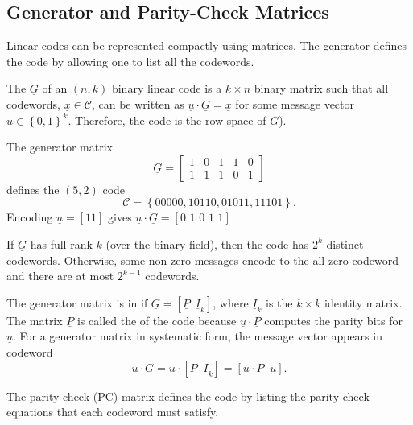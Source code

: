 \subsection{Generator and Parity-Check Matrices}

Linear codes can be represented compactly using matrices.
The generator defines the code by allowing one to list all the codewords.

\begin{definition}
The  $\underline{G}$ of an $(n,k)$ binary linear code is a $k\times n$ binary matrix such that all codewords, $\underline{x}\in\mathcal{C}$, can be written as $\underline{u}\cdot\underline{G}=\underline{x}$ for some message vector $\underline{u}\in\left\{ 0,1\right\} ^{k}$.
Therefore, the code is the row space of $\underline{G}$).
\end{definition}

\begin{example}
The generator matrix
\[\underline{G}=\left[\begin{array}{ccccc}
1 & 0 & 1 & 1 & 0\\
1 & 1 & 1 & 0 & 1\end{array}\right] \]
defines the $(5,2)$ code
\[ \mathcal{C} = \left\{ 00000,10110,01011,11101\right\}. \]
Encoding $\underline{u}=[11]$ gives $\underline{u}\cdot\underline{G}=[0\,\,1\,\,0\,\,1\,\,1]$
\end{example}

If $\underline{G}$ has full rank $k$ (over the binary field), then the code has $2^{k}$ distinct codewords.
Otherwise, some non-zero messages encode to the all-zero codeword and there are at most $2^{k-1}$ codewords.

\begin{definition}
The generator matrix is in  if $\underline{G}=\left[\underline{P}\,\,\,\underline{I}_{k}\right]$, where $\underline{I}_{k}$ is the $k\times k$ identity matrix.
The matrix $\underline{P}$ is called the  of the code because $\underline{u}\cdot\underline{P}$ computes the parity bits for $\underline{u}$.
For a generator matrix in systematic form, the message vector appears in codeword
\[\underline{u}\cdot\underline{G}=\underline{u}\cdot\left[\underline{P}\;\;\underline{I}_{k}\right]=\left[\underline{u}\!\cdot\!\underline{P}\;\;\underline{u}\right]. \]
\end{definition}

The parity-check (PC) matrix defines the code by listing the parity-check equations that each codeword must satisfy.

